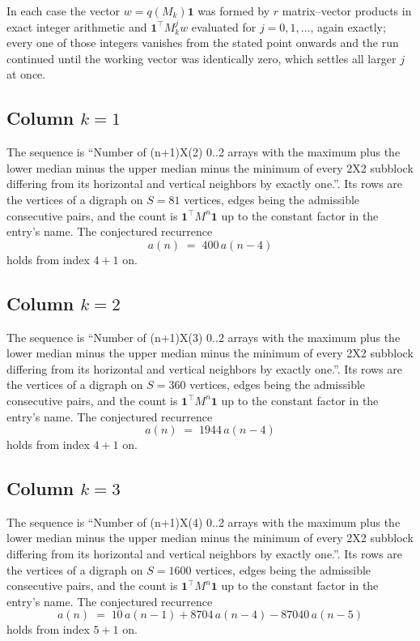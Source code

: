 \documentclass[11pt,a4paper]{article}
\theoremstyle{plain}
\theoremstyle{definition}
\begin{document}
In each case the vector $w=q(M_k)\mathbf{1}$ was formed by $r$ matrix--vector products in
exact integer arithmetic and $\mathbf{1}^{\!\top}M_k^{j}w$ evaluated for $j=0,1,\dots$,
again exactly; every one of those integers vanishes from the stated point onwards and the run
continued until the working vector was identically zero, which settles all larger $j$ at once.

\subsection*{Column $k$$=1$}
The sequence is ``Number of (n+1)X(2) 0..2 arrays with the maximum plus the lower median minus the upper median minus the minimum of every 2X2 subblock differing from its horizontal and vertical neighbors by exactly one.''. Its rows are the vertices of a digraph on
$S=81$ vertices, edges being the admissible consecutive pairs, and the count is
$\mathbf{1}^{\!\top}M^{n}\mathbf{1}$ up to the constant factor in the entry's name.
The conjectured recurrence
\[
a(n)\;=\;400\,a(n-4)
\]
holds from index $4+1$ on.

\subsection*{Column $k$$=2$}
The sequence is ``Number of (n+1)X(3) 0..2 arrays with the maximum plus the lower median minus the upper median minus the minimum of every 2X2 subblock differing from its horizontal and vertical neighbors by exactly one.''. Its rows are the vertices of a digraph on
$S=360$ vertices, edges being the admissible consecutive pairs, and the count is
$\mathbf{1}^{\!\top}M^{n}\mathbf{1}$ up to the constant factor in the entry's name.
The conjectured recurrence
\[
a(n)\;=\;1944\,a(n-4)
\]
holds from index $4+1$ on.

\subsection*{Column $k$$=3$}
The sequence is ``Number of (n+1)X(4) 0..2 arrays with the maximum plus the lower median minus the upper median minus the minimum of every 2X2 subblock differing from its horizontal and vertical neighbors by exactly one.''. Its rows are the vertices of a digraph on
$S=1600$ vertices, edges being the admissible consecutive pairs, and the count is
$\mathbf{1}^{\!\top}M^{n}\mathbf{1}$ up to the constant factor in the entry's name.
The conjectured recurrence
\[
a(n)\;=\;10\,a(n-1) + 8704\,a(n-4) - 87040\,a(n-5)
\]
holds from index $5+1$ on.
\end{document}
